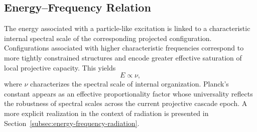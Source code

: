\subsection{Energy--Frequency Relation}
  \label{subsec:energy-frequency-solitons}

  The energy associated with a particle-like excitation is linked to a
  characteristic internal spectral scale of the corresponding projected
  configuration.
  Configurations associated with higher characteristic frequencies
  correspond to more tightly constrained structures and encode greater
  effective saturation of local projective capacity.
  This yields
  \begin{equation}
    E \propto \nu ,
  \end{equation}
  where $\nu$ characterizes the spectral scale of internal organization.
  Planck's constant appears as an effective proportionality factor whose
  universality reflects the robustness of spectral scales across the current
  projective cascade epoch.
  A more explicit realization in the context of radiation is presented in
  Section~\ref{subsec:energy-frequency-radiation}.
